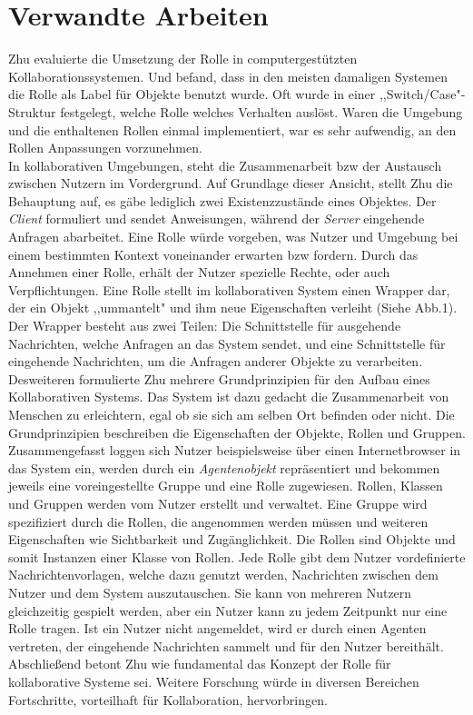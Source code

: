 \documentclass[conference]{IEEEtran}
\begin{document}
\section{Verwandte Arbeiten} Zhu evaluierte die Umsetzung der Rolle in computergestützten Kollaborationssystemen\cite{zhu2006role}. Und befand, dass in den meisten damaligen Systemen die Rolle als Label für Objekte benutzt wurde. Oft wurde in einer ,,Switch/Case"-Struktur festgelegt, welche Rolle welches Verhalten auslöst. Waren die Umgebung und die enthaltenen Rollen einmal implementiert, war es sehr aufwendig, an den Rollen Anpassungen vorzunehmen.\\ In kollaborativen Umgebungen, steht die Zusammenarbeit bzw der Austausch zwischen Nutzern im Vordergrund. Auf Grundlage dieser Ansicht, stellt Zhu die Behauptung auf, es gäbe lediglich zwei Existenzzustände eines Objektes. Der \textit{Client} formuliert und sendet Anweisungen, während der \textit{Server} eingehende Anfragen abarbeitet. Eine Rolle würde vorgeben, was Nutzer und Umgebung bei einem bestimmten Kontext voneinander erwarten bzw fordern. Durch das Annehmen einer Rolle, erhält der Nutzer spezielle Rechte, oder auch Verpflichtungen. Eine Rolle stellt im kollaborativen System einen Wrapper dar, der ein Objekt ,,ummantelt" und ihm neue Eigenschaften verleiht (Siehe Abb.1). Der Wrapper besteht aus zwei Teilen: Die Schnittstelle für ausgehende Nachrichten, welche Anfragen an das System sendet, und eine Schnittstelle für eingehende Nachrichten, um die Anfragen anderer Objekte zu verarbeiten. \\ Desweiteren formulierte Zhu mehrere Grundprinzipien für den Aufbau eines Kollaborativen Systems. Das System ist dazu gedacht die Zusammenarbeit von Menschen zu erleichtern, egal ob sie sich am selben Ort befinden oder nicht. Die Grundprinzipien beschreiben die Eigenschaften der Objekte, Rollen und Gruppen. Zusammengefasst loggen sich Nutzer beispielsweise über einen Internetbrowser in das System ein, werden durch ein \textit{Agentenobjekt} repräsentiert und bekommen jeweils eine voreingestellte Gruppe und eine Rolle zugewiesen. Rollen, Klassen und Gruppen werden vom Nutzer erstellt und verwaltet. Eine Gruppe wird spezifiziert durch die Rollen, die angenommen werden müssen und weiteren Eigenschaften wie Sichtbarkeit und Zugänglichkeit. Die Rollen sind Objekte und somit Instanzen einer Klasse von Rollen. Jede Rolle gibt dem Nutzer vordefinierte Nachrichtenvorlagen, welche dazu genutzt werden, Nachrichten zwischen dem Nutzer und dem System auszutauschen. Sie kann von mehreren Nutzern gleichzeitig gespielt werden, aber ein Nutzer kann zu jedem Zeitpunkt nur eine Rolle tragen. Ist ein Nutzer nicht angemeldet, wird er durch einen Agenten vertreten, der eingehende Nachrichten sammelt und für den Nutzer bereithält.\\ Abschließend betont Zhu wie fundamental das Konzept der Rolle für kollaborative Systeme sei. Weitere Forschung würde in diversen Bereichen Fortschritte, vorteilhaft für Kollaboration, hervorbringen.
\end{document}
